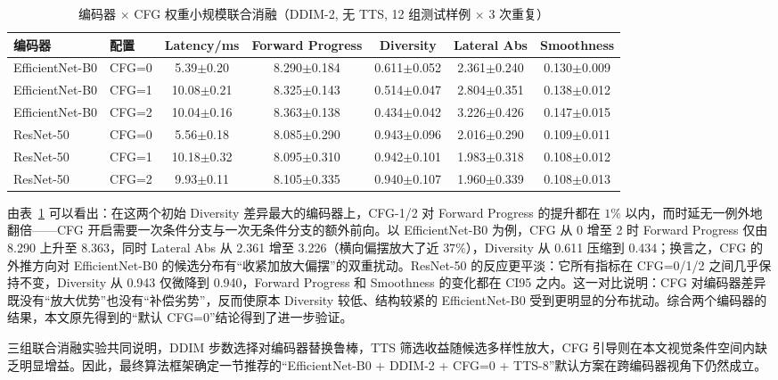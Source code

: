 \begin{table}[htbp]
    \centering
    \small
    \caption{编码器 $\times$ CFG 权重小规模联合消融（DDIM-2, 无 TTS, 12 组测试样例 $\times$ 3 次重复）}
    \label{tab:encoder-cfg-joint}
    \setlength{\tabcolsep}{3.5pt}
    \begin{tabular}{llccccc}
        \toprule
        编码器 & 配置 & Latency/ms & Forward Progress & Diversity & Lateral Abs & Smoothness \\
        \midrule
        EfficientNet-B0 & CFG=0 & 5.39$\pm$0.20 & 8.290$\pm$0.184 & 0.611$\pm$0.052 & 2.361$\pm$0.240 & 0.130$\pm$0.009 \\
        EfficientNet-B0 & CFG=1 & 10.08$\pm$0.21 & 8.325$\pm$0.143 & 0.514$\pm$0.047 & 2.804$\pm$0.351 & 0.138$\pm$0.012 \\
        EfficientNet-B0 & CFG=2 & 10.04$\pm$0.16 & 8.363$\pm$0.138 & 0.434$\pm$0.042 & 3.226$\pm$0.426 & 0.147$\pm$0.015 \\
        ResNet-50 & CFG=0 & 5.56$\pm$0.18 & 8.085$\pm$0.290 & 0.943$\pm$0.096 & 2.016$\pm$0.290 & 0.109$\pm$0.011 \\
        ResNet-50 & CFG=1 & 10.18$\pm$0.32 & 8.095$\pm$0.310 & 0.942$\pm$0.101 & 1.983$\pm$0.318 & 0.108$\pm$0.012 \\
        ResNet-50 & CFG=2 & 9.93$\pm$0.11 & 8.105$\pm$0.335 & 0.940$\pm$0.107 & 1.960$\pm$0.339 & 0.108$\pm$0.013 \\
        \bottomrule
    \end{tabular}
\end{table}

由表~\ref{tab:encoder-cfg-joint} 可以看出：在这两个初始 Diversity 差异最大的编码器上，CFG-1/2 对 Forward Progress 的提升都在 $1\%$ 以内，而时延无一例外地翻倍——CFG 开启需要一次条件分支与一次无条件分支的额外前向。以 EfficientNet-B0 为例，CFG 从 0 增至 2 时 Forward Progress 仅由 8.290 上升至 8.363，同时 Lateral Abs 从 2.361 增至 3.226（横向偏摆放大了近 $37\%$），Diversity 从 0.611 压缩到 0.434；换言之，CFG 的外推方向对 EfficientNet-B0 的候选分布有``收紧加放大偏摆''的双重扰动。ResNet-50 的反应更平淡：它所有指标在 CFG=0/1/2 之间几乎保持不变，Diversity 从 0.943 仅微降到 0.940，Forward Progress 和 Smoothness 的变化都在 CI95 之内。这一对比说明：CFG 对编码器差异既没有``放大优势''也没有``补偿劣势''，反而使原本 Diversity 较低、结构较紧的 EfficientNet-B0 受到更明显的分布扰动。综合两个编码器的结果，本文原先得到的``默认 CFG=0''结论得到了进一步验证。

三组联合消融实验共同说明，DDIM 步数选择对编码器替换鲁棒，TTS 筛选收益随候选多样性放大，CFG 引导则在本文视觉条件空间内缺乏明显增益。因此，最终算法框架确定一节推荐的``EfficientNet-B0 + DDIM-2 + CFG=0 + TTS-8''默认方案在跨编码器视角下仍然成立。

